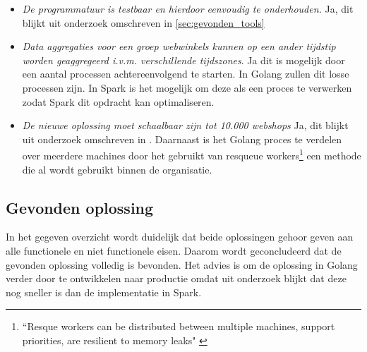\begin{itemize}
    \item \textit{De programmatuur is testbaar en hierdoor eenvoudig te onderhouden.}  Ja, dit blijkt uit onderzoek omschreven in  \ref{sec:gevonden_tools}
    
    \item \textit{Data aggregaties voor een groep webwinkels kunnen op een ander tijdstip worden geaggregeerd i.v.m. verschillende tijdszones}. Ja dit is mogelijk door een aantal processen achtereenvolgend te starten. In Golang zullen dit losse processen zijn. In Spark is het mogelijk om deze als een proces te verwerken zodat Spark dit opdracht kan optimaliseren.
    
    \item \textit{De nieuwe oplossing moet schaalbaar zijn tot 10.000 webshops} Ja, dit blijkt uit onderzoek omschreven in \label{sec:distributed}. Daarnaast is het Golang proces te verdelen over meerdere machines door het gebruikt van resqueue workers\footnote{``Resque workers can be distributed between multiple machines, support priorities, are resilient to memory leaks" \parencite{github2016reque}} een methode die al wordt gebruikt binnen de organisatie. 
\end{itemize}

\subsection{Gevonden oplossing}
 
In het gegeven overzicht wordt duidelijk dat beide oplossingen gehoor geven aan alle functionele en niet functionele eisen. Daarom wordt geconcludeerd dat de gevonden oplossing volledig is bevonden. Het advies is om de oplossing in Golang verder door te ontwikkelen naar productie omdat uit onderzoek blijkt dat deze nog sneller is dan de implementatie in Spark.